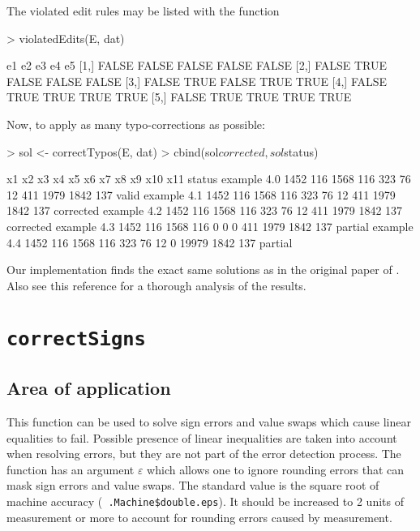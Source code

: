 \documentclass[11pt, fleqn, a4paper]{article}
\begin{document}
The violated edit rules may be listed with the function
\begin{Schunk}
\begin{Sinput}
> violatedEdits(E, dat)
\end{Sinput}
\begin{Soutput}
        e1    e2    e3    e4    e5
[1,] FALSE FALSE FALSE FALSE FALSE
[2,] FALSE  TRUE FALSE FALSE FALSE
[3,] FALSE  TRUE FALSE  TRUE  TRUE
[4,] FALSE  TRUE  TRUE  TRUE  TRUE
[5,] FALSE  TRUE  TRUE  TRUE  TRUE
\end{Soutput}
\end{Schunk}
Now, to apply as many typo-corrections as possible:
\begin{Schunk}
\begin{Sinput}
> sol <- correctTypos(E, dat)
> cbind(sol$corrected, sol$status)
\end{Sinput}
\begin{Soutput}
              x1  x2   x3  x4  x5 x6 x7  x8    x9  x10 x11    status
example 4.0 1452 116 1568 116 323 76 12 411  1979 1842 137     valid
example 4.1 1452 116 1568 116 323 76 12 411  1979 1842 137 corrected
example 4.2 1452 116 1568 116 323 76 12 411  1979 1842 137 corrected
example 4.3 1452 116 1568 116   0  0  0 411  1979 1842 137   partial
example 4.4 1452 116 1568 116 323 76 12   0 19979 1842 137   partial
\end{Soutput}
\end{Schunk}
Our implementation finds the exact same solutions as in the original paper of
\cite{scholtus:2009}.  Also see this reference for a thorough analysis of the
results.

%
%
%
\section{\tt correctSigns}
\label{signErrors}
\subsection{Area of application}
This function can be used to solve sign errors and value swaps which cause
linear equalities to fail. Possible presence of linear inequalities are taken
into account when resolving errors, but they are not part of the error
detection process. The function has an argument $\varepsilon$ which allows one
to ignore rounding errors that can mask sign errors and value swaps.  The
standard value is the square root of machine accuracy ({\tt
.Machine\$double.eps}).  It should be increased to 2 units of measurement or
more to account for rounding errors caused by measurement.
\end{document}
